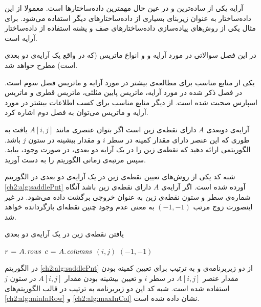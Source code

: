 

آرایه یکی از ساده‌ترین و در عین حال مهمترین داده‌ساختارها است. معمولا از این داده‌ساختار به عنوان زیربنای بسیاری از داده‌ساختارهای دیگر استفاده می‌شود. برای مثال یکی از روش‌های پیاده‌سازی داده‌ساختارهای صف و پشته استفاده از داده‌ساختار آرایه است.

در این فصل سوالاتی در مورد آرایه و و انواع ماتریس (که در واقع یک آرایه‌ی دو بعدی است) مطرح خواهد شد.

یکی از منابع مناسب برای مطالعه‌ی بیشتر در مورد آرایه و ماتریس فصل سوم {\cite{ebrahimi}} است. در فصل ذکر شده در مورد آرایه، ماتریس‌ پایین مثلثی، ماتریس‌ قطری و ماتریس اسپارس صحبت شده است. از دیگر منابع مناسب برای کسب اطلاعات بیشتر در مورد آرایه و ماتریس می‌توان به فصل دوم {\cite{horowitz}} اشاره کرد.


 آرایه‌ی دوبعدی {$A$} دارای نقطه‌ی زین است اگر بتوان عنصری مانند {$A[i,j]$} یافت به طوری که این عنصر دارای مقدار کمینه در سطر {$i$} و مقدار بیشینه در ستون {$j$} باشد. الگوریتمی ارائه دهید که نقطه‌ی زین را در یک آرایه دو بعدی، در صورت وجود، بیابد. سپس مرتبه‌ی زمانی الگوریتم را به دست آورید.


شبه کد یکی از روش‌های تعیین نقطه‌ی زین در یک آرایه‌ی دو بعدی در الگوریتم {\eqref{ch2:alg:saddlePnt}} آورده شده است. اگر آرایه‌ی {$A$} دارای نقطه‌ی زین باشد آنگاه شماره‌ی سطر و ستون نقطه‌ی زین به عنوان خروجی برگشت داده می‌شود. در غیر اینصورت زوج مرتب {$(-1,-1)$} به معنی عدم وجود چنین نقطه‌ای بازگردانده خواهد شد.
\begin{algorithm}
\caption{یافتن نقطه‌ی زین در یک آرایه‌ی دو بعدی}\label{ch2:alg:saddlePnt}
\begin{latin}
\begin{algorithmic}[1]
		\State	$r\mathrel{\hspace{1pt}=\hspace{1pt}} A.\hspace*{1pt}\mathit{rows}$
		\State	$c\mathrel{\hspace{1pt}=\hspace{1pt}} A.\hspace*{1pt}\mathit{columns}$		
										\State	\Return $(i,j)$
								\EndIf
						\EndIf
				\EndFor
		\EndFor
		\State	\Return $(-1,-1)$
\EndFunction
\end{algorithmic}
\end{latin}
\end{algorithm}

در الگوریتم {\eqref{ch2:alg:saddlePnt}} از دو زیربرنامه‌ی {} و {} به ترتیب برای تعیین کمینه بودن مقدار عنصر {$A[i,j]$} در سطر {$i$} و تعیین بیشینه بودن مقدار {$A[i,j]$} در ستون {$j$} استفاده شده است. شبه کد این دو زیربرنامه به ترتیب در قالب الگوریتم‌های {\eqref{ch2:alg:minInRow}} و {\eqref{ch2:alg:maxInCol}} نشان داده شده است.


